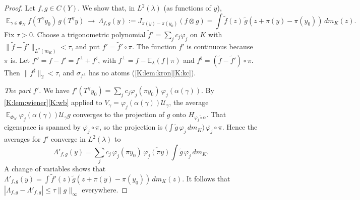 \begin{proof}
Let $f,g\in C(Y)$.
We show that, in $L^2(\lambda)$ (as functions of $y$),
\begin{equation}\label{K:eq:L2conv}
\mathop{\mathbb E}_{\gamma\in\Phi_N}f(T^\gamma y_0)\,g(T^\gamma y)\ \longrightarrow\
\Lambda_{f,g}(y):=J_{\pi(y)-\pi(y_0)}(f\otimes g)=\int\tilde f(z)\,\tilde g(z+\pi(y)-\pi(y_0))\,dm_K(z).
\end{equation}
Fix $\tau>0$. Choose a trigonometric polynomial $\tilde f'=\sum_jc_j\varphi_j$ on $K$
with $\|\tilde f-\tilde f'\|_{L^2(m_K)}<\tau$, and put $f'=\tilde f'\circ\pi$.
The function $f'$ is continuous because $\pi$ is.
Let $f''=f-f'=f^\perp+f^\sharp$, with $f^\perp=f-\mathbb E_\lambda(f\mid\pi)$ and
$f^\sharp=(\tilde f-\tilde f')\circ\pi$. Then $\|f^\sharp\|_2<\tau$, and $\sigma_{f^\perp}$ has no atoms
(\cref{K:lem:kron}\ref{K:kc}).

\emph{The part $f'$.}
We have $f'(T^\gamma y_0)=\sum_jc_j\varphi_j(\pi y_0)\,\varphi_j(\alpha(\gamma))$.
By \cref{K:lem:wiener}\ref{K:wb} applied to $V_\gamma=\varphi_j(\alpha(\gamma))\mathcal U_\gamma$, the
average $\mathop{\mathbb E}_{\Phi_N}\varphi_j(\alpha(\gamma))\mathcal U_\gamma g$ converges to the
projection of $g$ onto $H_{\overline{\varphi_j\circ\alpha}}$. That eigenspace is spanned by
$\overline{\varphi_j}\circ\pi$, so the projection is
$\big(\int\tilde g\,\varphi_j\,dm_K\big)\,\overline{\varphi_j}\circ\pi$.
Hence the averages for $f'$ converge in $L^2(\lambda)$ to
\[
\Lambda'_{f,g}(y)=\sum_jc_j\,\varphi_j(\pi y_0)\,\overline{\varphi_j(\pi y)}\int\tilde g\,\varphi_j\,dm_K .
\]
A change of variables shows that $\Lambda'_{f,g}(y)=\int\tilde f'(z)\tilde g(z+\pi(y)-\pi(y_0))\,dm_K(z)$.
It follows that $|\Lambda_{f,g}-\Lambda'_{f,g}|\le\tau\|g\|_\infty$ everywhere.


\end{proof}
